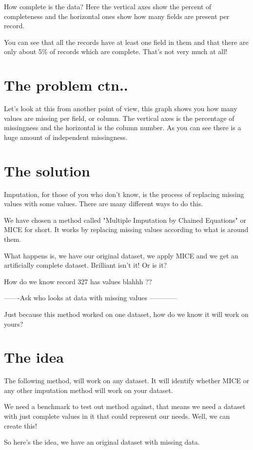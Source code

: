 \documentclass{report}
\begin{document}
How complete is the data? Here the vertical axes show the percent of completeness and the horizontal ones show how many fields are present per record. 

You can see that all the records have at least one field in them and that there are only about 5\% of records which are complete. That's not very much at all!

\section*{The problem ctn..}
Let's look at this from another point of view, this graph shows you how many values are missing per field, or column. The vertical axes is the percentage of missingness and the horizontal is the column number. As you can see there is a huge amount of independent missingness. 

\section*{The solution}
Imputation, for those of you who don't know, is the process of replacing missing values with some values. There are many different ways to do this. 

We have chosen a method called "Multiple Imputation by Chained Equations" or MICE for short. It works by replacing missing values according to what is around them. 

What happens is, we have our original dataset, we apply MICE and we get an artificially complete dataset. Brilliant isn't it! Or is it? 

How do we know record 327 has values blahhh ?? 

-------Ask who looks at data with missing values ------------

Just because this method worked on one dataset, how do we know it will work on yours? 

\section*{The idea}
The following method, will work on any dataset. It will identify whether MICE or any other imputation method will work on your dataset. 

We need a benchmark to test out method against, that means we need a dataset with just complete values in it that could represent our needs. Well, we can create this!

So here's the idea, we have an original dataset with missing data. 
\end{document}
